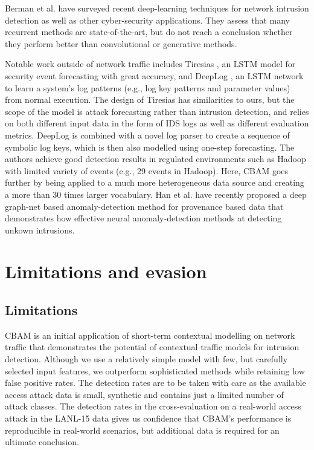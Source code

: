 Berman et al. \cite{berman2019survey} have surveyed recent deep-learning techniques for network intrusion detection as well as other cyber-security applications. They assess that many recurrent methods are state-of-the-art, but do not reach a conclusion whether they perform better than convolutional or generative methods.

Notable work outside of network traffic includes Tiresias \cite{shen2018tiresias}, an LSTM model for security event forecasting with great accuracy, 
and DeepLog \cite{du2017deeplog}, an LSTM network to learn a system's log patterns (e.g., log key patterns and parameter values) from normal execution. 
The design of Tiresias has similarities to ours, but the scope of the model is attack forecasting rather than intrusion detection, and relies on both different input data in the form of IDS logs as well as different evaluation metrics. DeepLog is combined with a novel log parser to create a sequence of symbolic log keys, which is then also modelled using one-step forecasting. The authors achieve good detection results in regulated environments such as Hadoop with limited variety of events (e.g., 29 events in Hadoop). Here, CBAM goes further by being applied to a much more heterogeneous data source and creating a more than 30 times larger vocabulary.
Han et al. \cite{han2020unicorn} have recently proposed a deep graph-net based anomaly-detection method for provenance based data that demonstrates  how effective neural anomaly-detection methods at detecting unkown intrusions.


\section{Limitations and evasion}\label{Sec:Resilience}

\subsection{Limitations}\label{Sec:Limitations}

CBAM is an initial application of short-term contextual modelling on network traffic that demonstrates the potential of contextual traffic models for intrusion detection. Although we use a relatively simple model with few, but carefully selected input features, we outperform sophisticated methods while retaining low false positive rates. The detection rates are to be taken with care as the available access attack data is small, synthetic and contains just a limited number of attack classes. The detection rates in the cross-evaluation on a real-world access attack in the LANL-15 data gives us confidence that CBAM's performance is reproducible in real-world scenarios, but additional data is required for an ultimate conclusion. 

